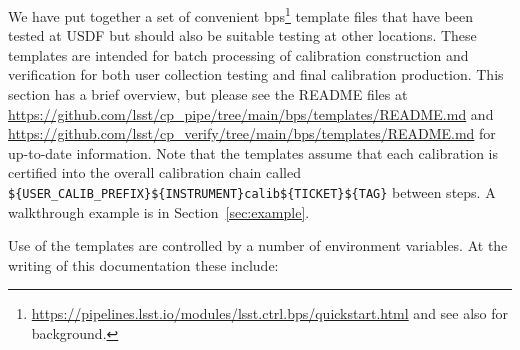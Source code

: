 \documentclass[DM,authoryear,toc]{lsstdoc}
\begin{document}
We have put together a set of convenient bps\footnote{\url{https://pipelines.lsst.io/modules/lsst.ctrl.bps/quickstart.html} and see also \citet{2022arXiv221115795G} for background.} template files that have been tested at USDF but should also be suitable testing at other locations.
These templates are intended for batch processing of calibration construction and verification for both user collection testing and final calibration production.
This section has a brief overview, but please see the README files at \url{https://github.com/lsst/cp_pipe/tree/main/bps/templates/README.md} and \url{https://github.com/lsst/cp_verify/tree/main/bps/templates/README.md} for up-to-date information.
Note that the templates assume that each calibration is certified into the overall calibration chain called \texttt{\$\{USER\_CALIB\_PREFIX\}\$\{INSTRUMENT\}\/calib\/\$\{TICKET\}\/\$\{TAG\}} between steps.
A walkthrough example is in Section~\ref{sec:example}.

Use of the templates are controlled by a number of environment variables.
At the writing of this documentation these include:
\end{document}
